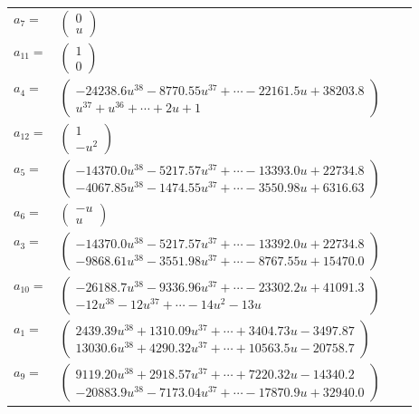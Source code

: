 \documentclass[1p]{elsarticle_modified}
\theoremstyle{definition}
\begin{document}
\begin{tabular}{m{7pt} m{180pt} m{7pt} m{180pt} }
\flushright $a_{7}=$&$\begin{pmatrix}0\\u\end{pmatrix}$ \\
\flushright $a_{11}=$&$\begin{pmatrix}1\\0\end{pmatrix}$ \\
\flushright $a_{4}=$&$\begin{pmatrix}-24238.6 u^{38}-8770.55 u^{37}+\cdots-22161.5 u+38203.8\\u^{37}+u^{36}+\cdots+2 u+1\end{pmatrix}$ \\
\flushright $a_{12}=$&$\begin{pmatrix}1\\- u^2\end{pmatrix}$ \\
\flushright $a_{5}=$&$\begin{pmatrix}-14370.0 u^{38}-5217.57 u^{37}+\cdots-13393.0 u+22734.8\\-4067.85 u^{38}-1474.55 u^{37}+\cdots-3550.98 u+6316.63\end{pmatrix}$ \\
\flushright $a_{6}=$&$\begin{pmatrix}- u\\u\end{pmatrix}$ \\
\flushright $a_{3}=$&$\begin{pmatrix}-14370.0 u^{38}-5217.57 u^{37}+\cdots-13392.0 u+22734.8\\-9868.61 u^{38}-3551.98 u^{37}+\cdots-8767.55 u+15470.0\end{pmatrix}$ \\
\flushright $a_{10}=$&$\begin{pmatrix}-26188.7 u^{38}-9336.96 u^{37}+\cdots-23302.2 u+41091.3\\-12 u^{38}-12 u^{37}+\cdots-14 u^2-13 u\end{pmatrix}$ \\
\flushright $a_{1}=$&$\begin{pmatrix}2439.39 u^{38}+1310.09 u^{37}+\cdots+3404.73 u-3497.87\\13030.6 u^{38}+4290.32 u^{37}+\cdots+10563.5 u-20758.7\end{pmatrix}$ \\
\flushright $a_{9}=$&$\begin{pmatrix}9119.20 u^{38}+2918.57 u^{37}+\cdots+7220.32 u-14340.2\\-20883.9 u^{38}-7173.04 u^{37}+\cdots-17870.9 u+32940.0\end{pmatrix}$ \\

\end{tabular}
\end{document}
